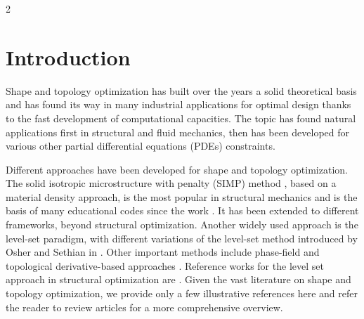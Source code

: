 \documentclass[a4paper, oneside]{article}
\begin{document}
\begin{multicols}{2}


\section{Introduction}




Shape and topology optimization \cite{MR2731611,SokZol92} has built over the years a solid theoretical basis and has found its way in many industrial applications for optimal design thanks to the fast development of computational capacities. 
The topic has found natural applications first  in structural and fluid mechanics, then has been developed for various other partial differential equations (PDEs) constraints. 

Different approaches have been developed for shape and topology optimization. 
The solid isotropic microstructure with penalty (SIMP) method \cite{MR2008524}, based on a material density approach,  is the most popular in structural mechanics and is the basis of many educational codes since the work \cite{Sigmund2014}. 
It has been extended to different frameworks, beyond structural optimization.
Another widely used approach is the level-set paradigm, with different variations of the level-set method introduced by Osher and Sethian in \cite{MR965860}. 
Other important methods include phase-field  \cite{MR2108636} and topological derivative-based approaches \cite{MR2235384}. 
Reference works for the level set approach in structural optimization are \cite{MR1911658,MR2033390}. 
Given the vast literature on shape and topology optimization, we provide only a few illustrative references here and refer the reader to review articles for a more comprehensive overview. 



\end{multicols}
\end{document}

